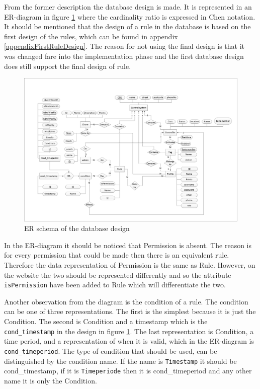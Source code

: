 From the former description the database design is made. It is represented in an ER-diagram in figure \ref{fig:ERdiagram} where the cardinality ratio is expressed in Chen notation\citep{DatabaseKilde}. It should be mentioned that the design of a rule in the database is based on the first design of the rules, which can be found in appendix \vref{appendixFirstRuleDesign}. The reason for not using the final design is that it was changed fare into the implementation phase and the first database design does still support the final design of rule. 

\begin{figure}
	\centering
		\includegraphics[width=1.50\textwidth,  angle=90]{images/ERdiagram.jpg}
	\caption{ER schema of the database design}
	\label{fig:ERdiagram}
\end{figure}

In the ER-diagram it should be noticed that Permission is absent. The reason is for every permission that could be made then there is an equivalent rule. Therefore the data representation of Permission is the same as Rule. However, on the website the two should be represented differently and so the attribute \texttt{isPermission} have been added to Rule which will differentiate the two.

Another observation from the diagram is the condition of a rule. The condition can be one of three representations. The first is the simplest because it is just the Condition. The second is Condition and a timestamp which is the \texttt{cond\_timestamp} in the design in figure \ref{fig:ERdiagram}. The last representation is Condition, a time period, and a representation of when it is valid, which in the ER-diagram is \texttt{cond\_timeperiod}. The type of condition that should be used, can be distinguished by the condition name. If the name is \texttt{Timestamp} it should be cond\_timestamp, if it is \texttt{Timeperiode} then it is cond\_timeperiod and any other name it is only the Condition. 


